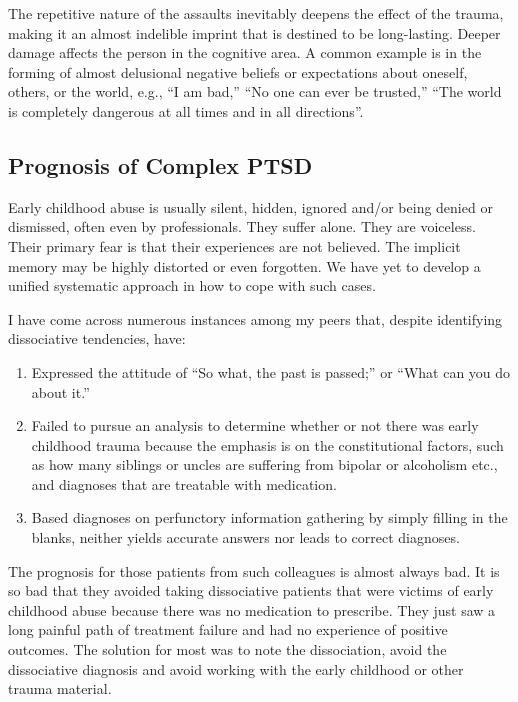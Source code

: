 \documentclass[]{book}
\begin{document}
The repetitive nature of the assaults inevitably deepens the effect of the trauma, making it an almost indelible imprint that is destined to be long-lasting. Deeper damage affects the person in the cognitive area. A common example is in the forming of almost delusional negative beliefs or expectations about oneself, others, or the world, e.g., ``I am bad,'' ``No one can ever be trusted,'' ``The world is completely dangerous at all times and in all directions''.

\hypertarget{prognosis-of-complex-ptsd}{%
\subsection*{Prognosis of Complex PTSD}\label{prognosis-of-complex-ptsd}}

Early childhood abuse is usually silent, hidden, ignored and/or being denied or dismissed, often even by professionals. They suffer alone. They are voiceless. Their primary fear is that their experiences are not believed. The implicit memory may be highly distorted or even forgotten. We have yet to develop a unified systematic approach in how to cope with such cases.

I have come across numerous instances among my peers that, despite identifying dissociative tendencies, have:

\begin{enumerate}
\def\labelenumi{\alph{enumi}.}
\item
  Expressed the attitude of ``So what, the past is passed;'' or ``What can you do about it.''
\item
  Failed to pursue an analysis to determine whether or not there was early childhood trauma because the emphasis is on the constitutional factors, such as how many siblings or uncles are suffering from bipolar or alcoholism etc., and diagnoses that are treatable with medication.
\item
  Based diagnoses on perfunctory information gathering by simply filling in the blanks, neither yields accurate answers nor leads to correct diagnoses.
\end{enumerate}

The prognosis for those patients from such colleagues is almost always bad. It is so bad that they avoided taking dissociative patients that were victims of early childhood abuse because there was no medication to prescribe. They just saw a long painful path of treatment failure and had no experience of positive outcomes. The solution for most was to note the dissociation, avoid the dissociative diagnosis and avoid working with the early childhood or other trauma material.
\end{document}
